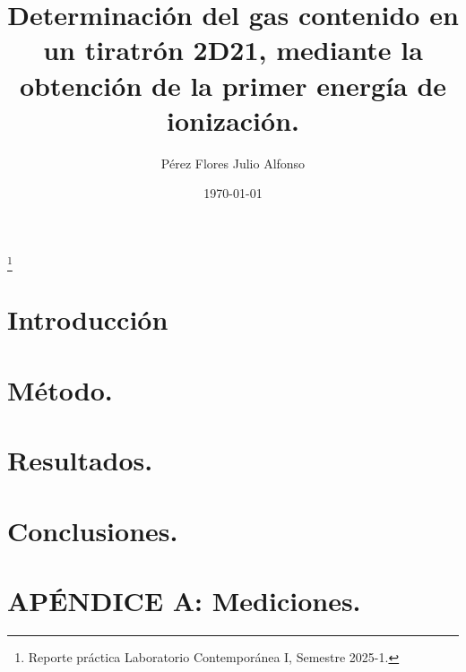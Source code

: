 \documentclass[letterpaper,spanish,reprint,nofootinbib,showkeys,aps]{revtex4-2}
\begin{document}
\allowdisplaybreaks

\title{Determinación del gas contenido en un tiratrón 2D21, mediante la obtención de la primer energía de ionización.}

\author{ Pérez Flores Julio Alfonso}

\thanks{Reporte práctica Laboratorio Contemporánea I, Semestre 2025-1.}

\date{\today}


\begin{abstract}
 
\end{abstract}



\maketitle


\section{ Introducción}\label{sec:introduccion}



\section{Método.}\label{sec:metodo}



\section{Resultados.}\label{sec:resdis}




\section{Conclusiones.}\label{sec:conclusiones}





\section{APÉNDICE A:  Mediciones.}





\end{document}
